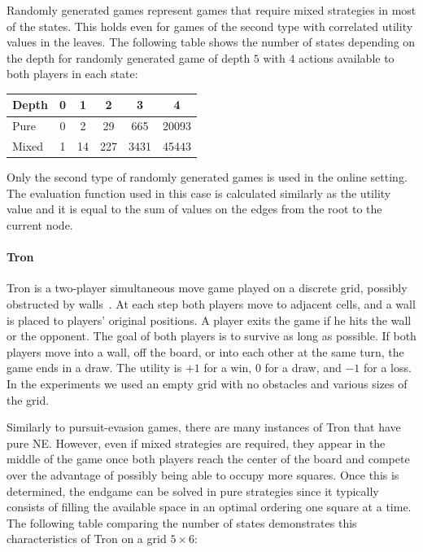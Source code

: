 Randomly generated games represent games that require mixed strategies in most of the states.
This holds even for games of the second type with correlated utility values in the leaves.
The following table shows the number of states depending on the depth for randomly generated game of depth $5$ with $4$ actions available to both players in each state:

\vspace{0.1cm}

\begin{center}
\small
\begin{tabular}{|l|c|c|c|c|c|}
\hline Depth & 0 & 1 & 2 & 3 & 4 \\
\hline Pure  & 0 & 2 & 29 & 665 & 20093 \\
\hline Mixed & 1 & 14 & 227 & 3431 & 45443 \\
\hline
\end{tabular}
\end{center}

\vspace{0.1cm}

Only the second type of randomly generated games is used in the online setting.
The evaluation function used in this case is calculated similarly as the utility value and it is equal to the sum of values on the edges from the root to the current node.

\paragraph{\textbf{Tron}}
Tron is a two-player simultaneous move game played on a discrete grid, possibly obstructed by
walls~\cite{Samothrakis10Tron,Perick12Comparison,Lanctot13Tron}.
At each step both players move to adjacent cells, and a wall is placed to players' original positions.
A player exits the game if he hits the wall or the opponent.
The goal of both players is to survive as long as possible.
If both players move into a wall, off the board, or into each other at the same turn, the game ends in a draw.
The utility is $+1$ for a win, $0$ for a draw, and $-1$ for a loss.
In the experiments we used an empty grid with no obstacles and various sizes of the grid.

Similarly to pursuit-evasion games, there are many instances of Tron that have pure NE.
However, even if mixed strategies are required, they appear in the middle of the game once both players reach the center of the board and compete over the advantage of possibly being able to occupy more squares.
Once this is determined, the endgame can be solved in pure strategies since it typically consists of filling the available space in an optimal ordering one square at a time.
The following table comparing the number of states demonstrates this characteristics of Tron on a grid $5\times6$:

